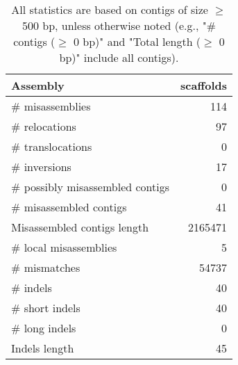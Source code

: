 \documentclass[12pt,a4paper]{article}
\begin{document}
\begin{table}[ht]
\begin{center}
\caption{All statistics are based on contigs of size $\geq$ 500 bp, unless otherwise noted (e.g., "\# contigs ($\geq$ 0 bp)" and "Total length ($\geq$ 0 bp)" include all contigs).}
\begin{tabular}{|l*{1}{|r}|}
\hline
Assembly & scaffolds \\ \hline
\# misassemblies & 114 \\ \hline
\hspace{5mm}\# relocations & 97 \\ \hline
\hspace{5mm}\# translocations & 0 \\ \hline
\hspace{5mm}\# inversions & 17 \\ \hline
\# possibly misassembled contigs & 0 \\ \hline
\# misassembled contigs & 41 \\ \hline
Misassembled contigs length & 2165471 \\ \hline
\# local misassemblies & 5 \\ \hline
\# mismatches & 54737 \\ \hline
\# indels & 40 \\ \hline
\hspace{5mm}\# short indels & 40 \\ \hline
\hspace{5mm}\# long indels & 0 \\ \hline
Indels length & 45 \\ \hline
\end{tabular}
\end{center}
\end{table}
\end{document}
